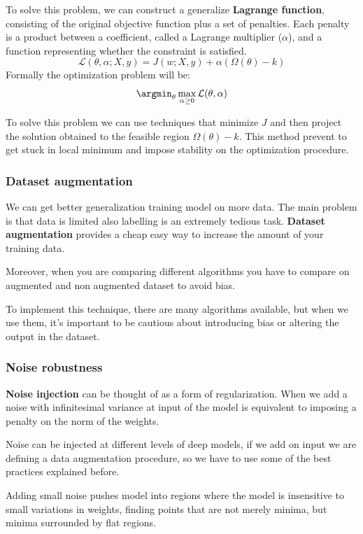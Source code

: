 To solve this problem, we can construct a generalize \textbf{Lagrange function},
consisting of the original objective function plus a set of penalties. Each
penalty is a product between a coefficient, called a Lagrange multiplier ($\alpha$),
and a function representing whether the constraint is satisfied.
\begin{equation}
    \mathcal{L}(\theta, \alpha; X,y) = J(w;X,y)+ \alpha(\Omega(\theta)-k)
\end{equation}
Formally the optimization problem will be:
\begin{equation}
    \argmin_\theta \max_{\alpha \geq 0} \mathcal{L}(\theta, \alpha)
\end{equation}

To solve this problem we can use techniques that minimize $J$ and then project
the solution obtained to the feasible region $\Omega(\theta) - k$. This method
prevent to get stuck in local minimum and impose stability on the optimization
procedure.
\subsubsection{Dataset augmentation}
We can get better generalization training model on more data. The main problem is
that data is limited also labelling is an extremely tedious task. \textbf{Dataset
    augmentation} provides a cheap easy way to increase the amount of your
training data.

Moreover, when you are comparing different algorithms you have to compare on
augmented and non augmented dataset to avoid bias.

To implement this technique, there are many algorithms available, but when we
use them, it's important to be cautious about introducing bias or altering the
output in the dataset.
\subsubsection{Noise robustness}
\textbf{Noise injection} can be thought of as a form of regularization. When we
add a noise with infinitesimal variance at input of the model is equivalent to
imposing a penalty on the norm of the weights.

Noise can be injected at different levels of deep models, if we add on input we
are defining a data augmentation procedure, so we have to use some of the best
practices explained before.

Adding small noise pushes model into regions where the model is insensitive to
small variations in weights, finding points that are not merely minima, but
minima surrounded by flat regions.

